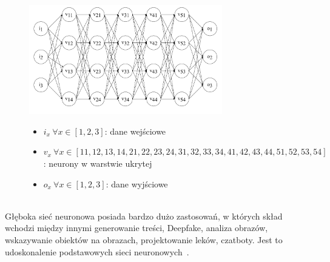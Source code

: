 \begin{figure}[H]
    \centering
    \includegraphics[width=0.75\textwidth]{images/deep-neural-network}
    \begin{itemize}
        \item[] $i_x \  \forall x \in [1, 2, 3]$: dane wejściowe
        \item[] $v_x \ \forall x \in [11, 12, 13, 14, 21, 22, 23, 24, 31, 32, 33, 34, 41, 42, 43, 44, 51, 52, 53, 54]$: neurony w warstwie ukrytej
        \item[] $o_x \ \forall x \in [1, 2, 3]$: dane wyjściowe
    \end{itemize}
    \label{fig:deep-learn}
\end{figure}
\ \\
Głęboka sieć neuronowa posiada bardzo dużo zastosowań, w których skład wchodzi między innymi generowanie treści, Deepfake, analiza obrazów, wskazywanie obiektów na obrazach, projektowanie leków, czatboty. Jest to udoskonalenie podstawowych sieci neuronowych~\cite{MicrosoftDeep2023}.